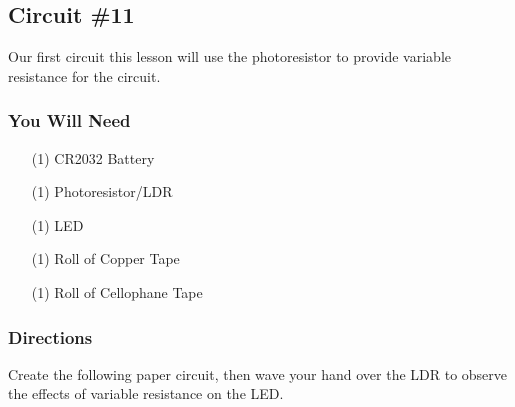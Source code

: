     \subsection{Circuit \#11}
    Our first circuit this lesson will use the photoresistor to provide variable resistance for the circuit.

    \subsubsection*{You Will Need}
    \begin{itemize}[noitemsep]
        \item[(1)] CR2032 Battery
        \item[(1)] Photoresistor/LDR
        \item[(1)] LED
        \item[(1)] Roll of Copper Tape
        \item[(1)] Roll of Cellophane Tape   
    \end{itemize}

    \subsubsection*{Directions}
    Create the following paper circuit, then wave your hand over the LDR to observe the effects of variable resistance on the LED.

